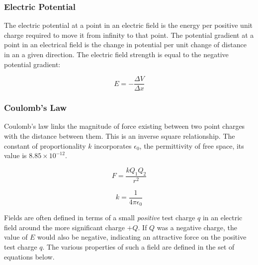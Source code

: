 \documentclass[12pt]{article}
\begin{document}
\subsubsection{Electric Potential}
\label{sec:org8bc4715}

The electric potential at a point in an electric field is the energy per positive unit charge required to move it from infinity to that point. The potential gradient at a point in an electrical field is the change in potential per unit change of distance in an a given direction. The electric field strength is equal to the negative potential gradient:

\[E = - \dfrac{\Delta V}{ \Delta x}\]

\subsubsection{Coulomb's Law}
\label{sec:org29278f0}

Coulomb's law links the magnitude of force existing between two point charges with the distance between them. This is an inverse square relationship. The constant of proportionality \(k\) incorporates \(\epsilon_0\), the permittivity of free space, its value is \(8.85 \times 10^{-12}\).

\begin{figure}[H]
\centering
\begin{minipage}{.8\textwidth}
\begin{tcolorbox}[
sharp corners=all,
colback=white,
colframe=white,
size=tight,
boxrule=0.2mm,
left=10mm, right=10mm
]
\begin{multicols}{2}

\[F = \dfrac{kQ_1Q_2}{r^2}\]
\columnbreak

\[k = \dfrac{1}{4 \pi \epsilon_0}\]
\end{multicols}
\end{tcolorbox}
\end{minipage}
\end{figure}

Fields are often defined in terms of a small \emph{positive} test charge \(q\) in an electric field around the more significant charge \(+Q\). If \(Q\) was a negative charge, the value of \(E\) would also be negative, indicating an attractive force on the positive test charge \(q\). The various properties of such a field are defined in the set of equations below.
\end{document}
